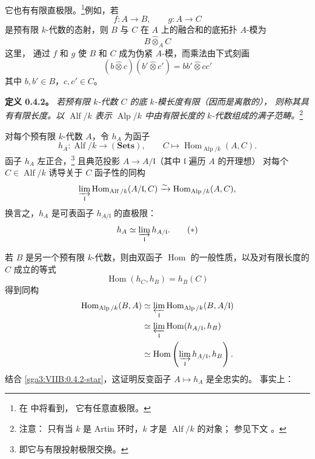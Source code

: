 它也有有限直极限。\footnote{在  中将看到，
它有任意直极限。}例如，若
\[
  f:A\longrightarrow B,
  \qquad
  g:A\longrightarrow C
\]
是预有限 \(k\)-代数的态射，则 \(B\) 与 \(C\) 在 \(A\) 上的融合和的底拓扑 \(A\)-模为
\[
  B\widehat{\otimes}_A C
\]
这里， 通过 \(f\) 和 \(g\) 使 \(B\) 和
\(C\) 成为伪紧 \(A\)-模，而乘法由下式刻画
\[
  (b\widehat{\otimes}c)
  (b'\widehat{\otimes}c')
  =
  bb'\widehat{\otimes}cc'
\]
其中 \(b,b'\in B\)，\(c,c'\in C\)。

\medskip
\noindent\textbf{定义 0.4.2。}
\label{sga3:VIIB:0.4.2}
\textit{若预有限 \(k\)-代数 \(C\) 的底 \(k\)-模长度有限（因而是离散的），
则称其具有\emph{有限长度}。以 \(\operatorname{Alf}/k\) 表示
\(\operatorname{Alp}/k\) 中由有限长度的 \(k\)-代数组成的满子范畴。}\footnote{注意：
只有当 \(k\) 是 Artin 环时，\(k\) 才是 \(\operatorname{Alf}/k\) 的对象；
参见下文 。}

对每个预有限 \(k\)-代数 \(A\)，令 \(h_A\) 为函子
\[
  h_A:\operatorname{Alf}/k\longrightarrow(\mathbf{Sets}),
  \qquad
  C\longmapsto
  \operatorname{Hom}_{\operatorname{Alp}/k}(A,C).
\]
函子 \(h_A\) 左正合，\footnote{即它与有限投射极限交换。}
且典范投影 \(A\to A/\mathfrak l\)（其中 \(\mathfrak l\) 遍历 \(A\) 的开理想）
对每个 \(C\in\operatorname{Alf}/k\) 诱导关于 \(C\) 函子性的同构
\[
  \varinjlim_{\mathfrak l}
  \operatorname{Hom}_{\operatorname{Alf}/k}(A/\mathfrak l,C)
  \xrightarrow{\sim}
  \operatorname{Hom}_{\operatorname{Alp}/k}(A,C),
\]
换言之，\(h_A\) 是可表函子 \(h_{A/\mathfrak l}\) 的直极限：
\begin{equation}
  h_A\simeq\varinjlim_{\mathfrak l}h_{A/\mathfrak l}.
  \tag{\(\ast\)}
  \label{sga3:VIIB:0.4.2-star}
\end{equation}

若 \(B\) 是另一个预有限 \(k\)-代数，则由双函子 \(\operatorname{Hom}\)
的一般性质，以及对有限长度的 \(C\) 成立的等式
\[
  \operatorname{Hom}(h_C,h_B)=h_B(C)
\]
得到同构
\begin{align*}
  \operatorname{Hom}_{\operatorname{Alp}/k}(B,A)
  &\simeq
  \varprojlim_{\mathfrak l}
  \operatorname{Hom}_{\operatorname{Alp}/k}(B,A/\mathfrak l)
  \\
  &\simeq
  \varprojlim_{\mathfrak l}
  \operatorname{Hom}(h_{A/\mathfrak l},h_B)
  \\
  &\simeq
  \operatorname{Hom}
    \left(\varinjlim_{\mathfrak l}h_{A/\mathfrak l},h_B\right).
\end{align*}
结合 \eqref{sga3:VIIB:0.4.2-star}，这证明反变函子 \(A\mapsto h_A\) 是全忠实的。
事实上：

